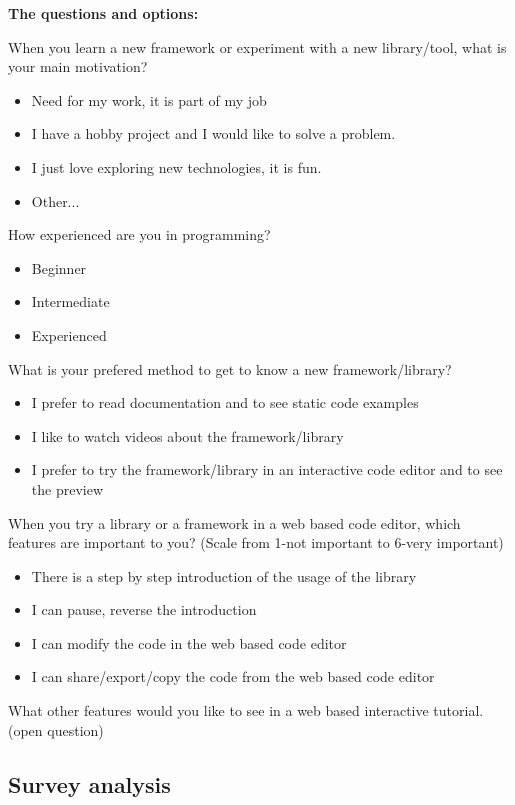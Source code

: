 \documentclass[12pt, a4paper, oneside, openright, medskipamount]{report}
\begin{document}
\textbf{The questions and options:}

\noindent When you learn a new framework or experiment with a new library/tool, what is your main motivation?
\begin{itemize}[noitemsep]
\item Need for my work, it is part of my job
\item I have a hobby project and I would like to solve a problem.
\item I just love exploring new technologies, it is fun.
\item Other...
\end{itemize}

\noindent How experienced are you in programming?
\begin{itemize}[noitemsep]
\item Beginner
\item Intermediate
\item Experienced
\end{itemize}

\noindent What is your prefered method to get to know a new framework/library?
\begin{itemize}[noitemsep]
\item I prefer to read documentation and to see static code examples
\item I like to watch videos about the framework/library
\item I prefer to try the framework/library in an interactive code editor and to see the preview
\end{itemize}

\noindent When you try a library or a framework in a web based code editor, which features are important to you? (Scale from 1-not important to 6-very important)
\begin{itemize}[noitemsep]
\item There is a step by step introduction of the usage of the library
\item I can pause, reverse the introduction
\item I can modify the code in the web based code editor
\item I can share/export/copy the code from the web based code editor
\end{itemize}

What other features would you like to see in a web based interactive tutorial.
(open question)

\subsection{Survey analysis}
\end{document}
